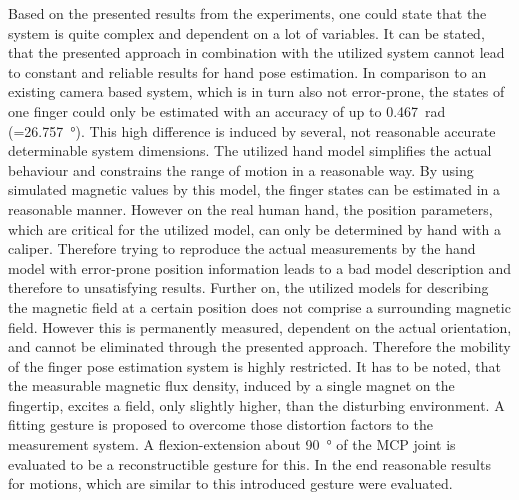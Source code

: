 Based on the presented results from the experiments, one could state that the system is quite complex and dependent on a lot of variables. It can be stated, that the presented approach in combination with the utilized system cannot lead to constant and reliable results for hand pose estimation. In comparison to an existing camera based system, which is in turn also not error-prone, the states of one finger could only be estimated with an accuracy of up to \SI{0.467}{\radian} (=\SI{26.757}{\degree}). This high difference is induced by several, not reasonable accurate determinable system dimensions. The utilized hand model simplifies the actual behaviour and constrains the range of motion in a reasonable way. By using simulated magnetic values by this model, the finger states can be estimated in a reasonable manner. However on the real human hand, the position parameters, which are critical for the utilized model, can only be determined by hand with a caliper. Therefore trying to reproduce the actual measurements by the hand model with error-prone position information leads to a bad model description and therefore to unsatisfying results. Further on, the utilized models for describing the magnetic field at a certain position does not comprise a surrounding magnetic field. However this is permanently measured, dependent on the actual orientation, and cannot be eliminated through the presented approach. Therefore the mobility of the finger pose estimation system is highly restricted. It has to be noted, that the measurable magnetic flux density, induced by a single magnet on the fingertip, excites a field, only slightly higher, than the disturbing environment. A fitting gesture is proposed to overcome those distortion factors to the measurement system. A flexion-extension about \SI{90}{\degree} of the \ac{MCP} joint is evaluated to be a reconstructible gesture for this. In the end reasonable results for motions, which are similar to this introduced gesture were evaluated. 



